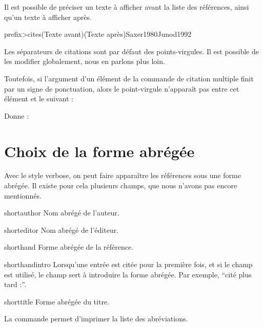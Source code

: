 Il est possible de préciser un texte à afficher avant la liste des références, ainsi qu'un texte à afficher après.

\begin{latexcode}
\<prefix>cites(Texte avant)(Texte après){Saxer1980}{Junod1992}
\end{latexcode}

Les séparateurs de citations sont par défaut des points-virgules. Il est possible de les modifier globalement, nous en parlons plus loin.

Toutefois, si l'argument  d'un élément de la commande de citation multiple finit par un signe de ponctuation, alors le point-virgule n'apparaît pas entre cet élément et le suivant :

\begin{latexcode}
\autocites[on consultera également :]{Saxer1980}{Urner1952}
\end{latexcode}

Donne :

\begin{quotation}
\cites[on consultera également :]{Saxer1980}{Urner1952}
\end{quotation}


\section{Choix de la forme abrégée}\label{shortfields}

Avec le style verbose, on peut faire apparaître les références sous une forme abrégée. Il existe pour cela plusieurs champs, que nous n'avons pas encore mentionnés.

\begin{choix}
    \item[shortauthor] Nom abrégé de l'auteur.
    \item[shorteditor] Nom abrégé de l'éditeur.
    \item[shorthand] Forme abrégée de la référence.
    \item[shorthandintro] Lorsqu'une entrée est citée pour la première fois, et si le champ  est utilisé, le champ  sert à introduire la forme abrégée. Par exemple, \enquote{cité plus tard :}.
    \item[shorttitle] Forme abrégée du titre.
\end{choix}

La commande  permet d'imprimer la liste des abréviations.

\bibverbosetrad
